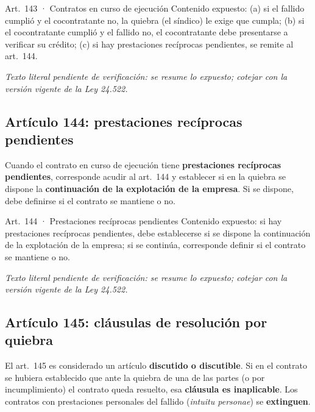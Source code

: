 \documentclass[12pt,oneside]{book}
\begin{document}
\begin{norma}{Art.~143 · Contratos en curso de ejecución}
Contenido expuesto: (a) si el fallido cumplió y el cocontratante no, la quiebra (el síndico) le exige que cumpla; (b) si el cocontratante cumplió y el fallido no, el cocontratante debe presentarse a verificar su crédito; (c) si hay prestaciones recíprocas pendientes, se remite al art.~144.

\par\smallskip\textit{Texto literal pendiente de verificación: se resume lo expuesto; cotejar con la versión vigente de la Ley 24.522.}
\end{norma}

\subsection{Artículo 144: prestaciones recíprocas pendientes}

Cuando el contrato en curso de ejecución tiene \textbf{prestaciones recíprocas pendientes}, corresponde acudir al art.~144 y establecer si en la quiebra se dispone la \textbf{continuación de la explotación de la empresa}. Si se dispone, debe definirse si el contrato se mantiene o no.

\begin{norma}{Art.~144 · Prestaciones recíprocas pendientes}
Contenido expuesto: si hay prestaciones recíprocas pendientes, debe establecerse si se dispone la continuación de la explotación de la empresa; si se continúa, corresponde definir si el contrato se mantiene o no.

\par\smallskip\textit{Texto literal pendiente de verificación: se resume lo expuesto; cotejar con la versión vigente de la Ley 24.522.}
\end{norma}

\subsection{Artículo 145: cláusulas de resolución por quiebra}

El art.~145 es considerado un artículo \textbf{discutido o discutible}. Si en el contrato se hubiera establecido que ante la quiebra de una de las partes (o por incumplimiento) el contrato queda resuelto, esa \textbf{cláusula es inaplicable}. Los contratos con prestaciones personales del fallido (\textit{intuitu personae}) se \textbf{extinguen}.
\end{document}
